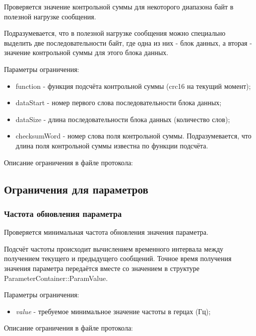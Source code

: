 Проверяется значение контрольной суммы для некоторого диапазона байт в полезной 
нагрузке сообщения.

Подразумевается, что в полезной нагрузке сообщения можно специально выделить 
две последовательности байт, где одна из них - блок данных, а вторая - значение 
контрольной суммы для этого блока данных.

Параметры ограничения:

\begin{itemize}
 \item function - функция подсчёта контрольной суммы (crc16 на текущий момент);
 \item dataStart - номер первого слова последовательности блока данных;
 \item dataSize - длина последовательности блока данных (количество слов);
 \item checksumWord - номер слова поля контрольной суммы. 
Подразумевается, что длина поля контрольной суммы известна по функции подсчёта.
\end{itemize}

Описание ограничения в файле протокола:



\subsection{Ограничения для параметров}

\subsubsection{Частота обновления параметра}

Проверяется минимальная частота обновления значения параметра.

Подсчёт частоты происходит вычислением временного интервала между получением 
текущего и предыдущего сообщений. Точное время получения значения
параметра передаётся вместе со значением в структуре 
ParameterContainer::ParamValue.

Параметры ограничения:

\begin{itemize}
 \item \textit{value} - требуемое минимальное значение частоты в герцах (Гц);
\end{itemize}

Описание ограничения в файле протокола:

